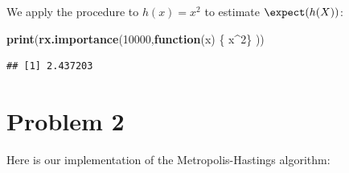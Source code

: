 \documentclass[
  11pt,
]{article}
\newenvironment{Shaded}{\begin{snugshade}}{\end{snugshade}}
\newcommand{\ControlFlowTok}[1]{\textcolor[rgb]{0.13,0.29,0.53}{\textbf{#1}}}
\newcommand{\DecValTok}[1]{\textcolor[rgb]{0.00,0.00,0.81}{#1}}
\newcommand{\FunctionTok}[1]{\textcolor[rgb]{0.13,0.29,0.53}{\textbf{#1}}}
\newcommand{\NormalTok}[1]{#1}
\newcommand{\SpecialCharTok}[1]{\textcolor[rgb]{0.81,0.36,0.00}{\textbf{#1}}}
\begin{document}
We apply the procedure to \(h(x) = x^2\) to estimate \(\expect(h(X))\):

\begin{Shaded}
\begin{Highlighting}[]
\FunctionTok{print}\NormalTok{(}\FunctionTok{rx.importance}\NormalTok{(}\DecValTok{10000}\NormalTok{,}\ControlFlowTok{function}\NormalTok{(x) \{ x}\SpecialCharTok{\^{}}\DecValTok{2}\NormalTok{\} ))}
\end{Highlighting}
\end{Shaded}

\begin{verbatim}
## [1] 2.437203
\end{verbatim}

\hypertarget{problem-2}{%
\section{Problem 2}\label{problem-2}}


Here is our implementation of the Metropolis-Hastings algorithm:
\end{document}
